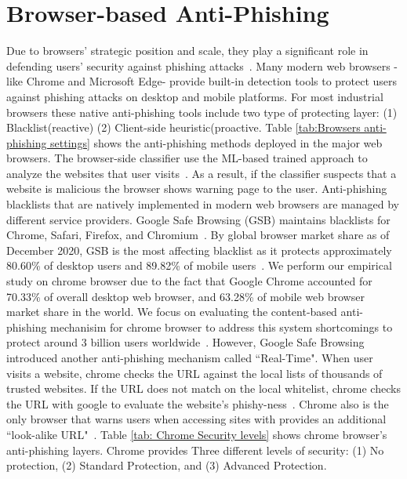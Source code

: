 \documentclass[letterpaper,twocolumn,10pt]{article}
\begin{document}

\section{Browser-based Anti-Phishing}

Due to browsers' strategic position and scale, they play a significant role in defending users' security against phishing attacks~\cite{ma2009beyond}. Many modern web browsers -like Chrome and Microsoft Edge- provide built-in detection tools to protect users against phishing attacks on desktop and mobile platforms. For most industrial browsers these native anti-phishing tools include two type of protecting layer: (1) Blacklist(reactive) (2) Client-side heuristic(proactive.
Table \ref{tab:Browsers anti-phishing settings} shows the anti-phishing methods deployed in the major web browsers.
The browser-side classifier use the ML-based trained approach to analyze the websites that user visits~\cite{liang2016cracking}. As a result, if the classifier suspects that a website is malicious the browser shows warning page to the user.
Anti-phishing blacklists that are natively implemented in modern web browsers are managed by different service providers. Google Safe Browsing (GSB) maintains blacklists for Chrome, Safari, Firefox, and Chromium~\cite{safebrowsing}.
By global browser market share as of December 2020, GSB is the most affecting blacklist as it protects approximately 80.60\%  of desktop users and 89.82\%  of mobile users~\cite{statcounterall,browsermarketshare}. We perform our empirical study on chrome browser due to the fact that Google Chrome accounted for 70.33\%  of overall desktop web browser, and 63.28\%  of mobile web browser market share in the world. We focus on evaluating the content-based anti-phishing mechanisim for chrome browser to address this system shortcomings to protect around 3 billion users worldwide~\cite{statcounterdesktop,statcountermobile}.
However, Google Safe Browsing introduced another anti-phishing mechanism called ``Real-Time". When user visits a website, chrome checks the URL against the local lists of thousands of trusted websites. If the URL does not match on the local whitelist, chrome checks the URL with google to evaluate the website's phishy-ness~\cite{googlechromeprivacywhitepaper}. Chrome also is the only browser that warns users when accessing sites with provides an additional ``look-alike URL"~\cite{cimpanu_2019}.
Table \ref{tab: Chrome Security levels} shows chrome browser's anti-phishing layers.
Chrome provides Three different levels of security: (1) No protection, (2) Standard Protection, and (3) Advanced Protection.
\end{document}
